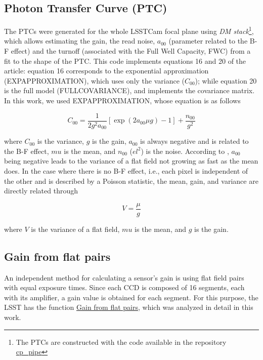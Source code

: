 \subsection{Photon Transfer Curve (PTC)}

The PTCs were generated for the whole LSSTCam focal plane using  \textit{DM stack}\footnote{The PTCs are constructed with the code available in the repository \href{https://github.com/lsst/cp_pipe}{cp\_pipe}}, which allows estimating the gain, the read noise, $a_{00}$ (parameter related to the B-F effect) and the turnoff (associated with the Full Well Capacity, FWC) from a fit to the shape of the PTC. This code implements equations 16 and 20 of the \cite{astier2019shape} article: equation 16 corresponds to the exponential approximation (EXPAPPROXIMATION), which uses only the variance ($C_00$); while equation 20 is the full model (FULLCOVARIANCE), and implements the covariance matrix. In this work, we used EXPAPPROXIMATION, whose equation is as follows

\begin{equation}
    C_{00} = \frac{1}{2 g^2 a_{00}} [\exp (2 a_{00} \mu g) - 1] + \frac{n_{00}}{g^2}
    \label{eq:Astier16}
\end{equation}

where $C_{00}$ is the variance, $g$ is the gain, $a_{00}$ is always negative and is related to the B-F effect, $mu$ is the mean, and $n_{00}$ ($el^{2}$) is the noise. According to \cite{astier2019shape}, $a_{00}$ being negative leads to the variance of a flat field not growing as fast as the mean does. In the case where there is no B-F effect, i.e., each pixel is independent of the other and is described by a Poisson statistic, the mean, gain, and variance are directly related through 

\begin{equation}
    V = \frac{\mu}{g}
    \label{eq:gain_Poisson}
\end{equation}

where $V$ is the variance of a flat field, $mu$ is the mean, and $g$ is the gain.

\subsection{Gain from flat pairs} \label{subsec: method_gainflat}

An independent method for calculating a sensor's gain is using flat field pairs with equal exposure times. Since each CCD is composed of 16 segments, each with its amplifier, a gain value is obtained for each segment. For this purpose, the LSST has the function \href{https://github.com/lsst/cp_pipe/blob/main/python/lsst/cp/pipe/ptc/cpExtractPtcTask.py#L679}{Gain from flat pairs}, which was analyzed in detail in this work. 

